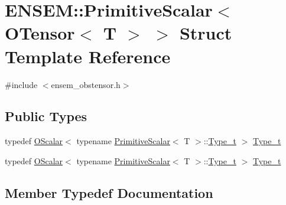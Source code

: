 \hypertarget{structENSEM_1_1PrimitiveScalar_3_01OTensor_3_01T_01_4_01_4}{}\section{E\+N\+S\+EM\+:\+:Primitive\+Scalar$<$ O\+Tensor$<$ T $>$ $>$ Struct Template Reference}
\label{structENSEM_1_1PrimitiveScalar_3_01OTensor_3_01T_01_4_01_4}


{\ttfamily \#include $<$ensem\+\_\+obstensor.\+h$>$}

\subsection*{Public Types}
\begin{DoxyCompactItemize}
\item 
typedef \mbox{\hyperlink{classENSEM_1_1OScalar}{O\+Scalar}}$<$ typename \mbox{\hyperlink{structENSEM_1_1PrimitiveScalar}{Primitive\+Scalar}}$<$ T $>$\+::\mbox{\hyperlink{structENSEM_1_1PrimitiveScalar_3_01OTensor_3_01T_01_4_01_4_ac573a5e5194a65a39e552fdebda4994c}{Type\+\_\+t}} $>$ \mbox{\hyperlink{structENSEM_1_1PrimitiveScalar_3_01OTensor_3_01T_01_4_01_4_ac573a5e5194a65a39e552fdebda4994c}{Type\+\_\+t}}
\item 
typedef \mbox{\hyperlink{classENSEM_1_1OScalar}{O\+Scalar}}$<$ typename \mbox{\hyperlink{structENSEM_1_1PrimitiveScalar}{Primitive\+Scalar}}$<$ T $>$\+::\mbox{\hyperlink{structENSEM_1_1PrimitiveScalar_3_01OTensor_3_01T_01_4_01_4_ac573a5e5194a65a39e552fdebda4994c}{Type\+\_\+t}} $>$ \mbox{\hyperlink{structENSEM_1_1PrimitiveScalar_3_01OTensor_3_01T_01_4_01_4_ac573a5e5194a65a39e552fdebda4994c}{Type\+\_\+t}}
\end{DoxyCompactItemize}


\subsection{Member Typedef Documentation}
\mbox{\label{structENSEM_1_1PrimitiveScalar_3_01OTensor_3_01T_01_4_01_4_ac573a5e5194a65a39e552fdebda4994c}} 
